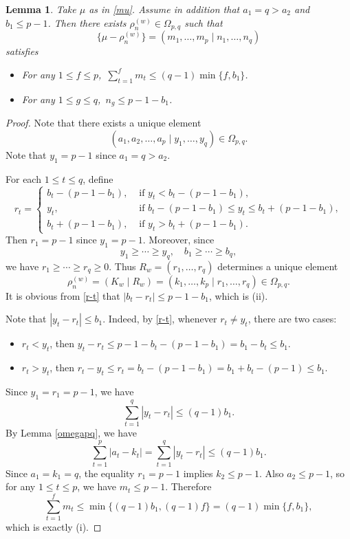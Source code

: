 \documentclass[11pt]{amsart}
\theoremstyle{plain}
\newtheorem{lemma}[thm]{Lemma}
\theoremstyle{definition}
\begin{document}
\begin{lemma}\label{lem2}
Take $\mu$ as in \eqref{mu}. Assume in addition that $a_1=q>a_2$ and $b_1\leq p-1$. Then there exists $\rho_n^{(w)}\in \Omega_{p, q}$ such that
	\[\{\mu-\rho_n^{(w)}\}=(m_1, \dots, m_p \mid n_1, \dots, n_q)\]
satisfies
	\begin{itemize}
		\item[(i)] For any $1\le f\le p$,\ $\sum_{t=1}^f m_t\le (q-1)\min\{f, b_1\}$.
		\item[(ii)] For any $1\le g\le q$,\ $n_g\le p-1-b_1$.
	\end{itemize}
\end{lemma}
\begin{proof}
Note that there exists a unique element
	\[(a_1,a_2,\dots,a_p\mid y_1,\dots,y_q)\in\Omega_{p,q}.\]
Note that $y_1=p-1$ since $a_1=q>a_2$.

	For each $1\le t\le q$, define
\begin{equation}\label{r-t}
r_t=
\begin{cases}
b_t-(p-1-b_1),  & \text{ if } y_t<b_t-(p-1-b_1),\\
y_t,  & \text{ if } b_t-(p-1-b_1)\leq y_t \leq b_t+(p-1-b_1),\\
b_t+(p-1-b_1),  & \text{ if } y_t > b_t+(p-1-b_1).
\end{cases}
\end{equation}
	Then $r_1=p-1$ since $y_1=p-1$. Moreover, since
$$
y_1\ge\cdots\ge y_q, \quad b_1\ge\cdots\ge b_q,
$$
we have $r_1\ge\cdots\ge r_q\ge 0$. Thus $R_w=(r_1,\dots,r_q)$ determines a unique element
	\[\rho_n^{(w)}=(K_w\mid R_w)=(k_1,\dots,k_p\mid r_1,\dots,r_q)\in \Omega_{p,q}.\]
It is obvious from \eqref{r-t} that $|b_t-r_t|\le p-1-b_1$, which is (ii).


Note that $|y_t-r_t|\le b_1$.	
Indeed, by \eqref{r-t}, whenever $r_t\neq y_t$, there are two cases:
		\begin{itemize}
		\item[$\bullet$] $r_t<y_t$, then $y_t-r_t\le p-1-b_t-(p-1-b_1)=b_1-b_t\le b_1$.
		\item[$\bullet$] $r_t>y_t$, then $r_t-y_t\le r_t=b_t-(p-1-b_1)=b_1+b_t-(p-1)\le b_1$.
	\end{itemize}
	Since $y_1=r_1=p-1$, we have
		\[\sum_{t=1}^q|y_t-r_t|\le (q-1)b_1.\]
	By Lemma \ref{omegapq}, we have
	\[\sum_{t=1}^p|a_t-k_t|=\sum_{t=1}^q|y_t-r_t|\le (q-1)b_1.\]
	Since $a_1=k_1=q$, the equality $r_1=p-1$ implies $k_2\le p-1$. Also $a_2\le p-1$, so for any $1\le t\le p$, we have $m_t\le p-1$. Therefore
	\[\sum_{t=1}^fm_t\le\min\{(q-1)b_1,(q-1)f\}=(q-1)\min\{f, b_1\},\]
	which is exactly (i).
\end{proof}
\end{document}
